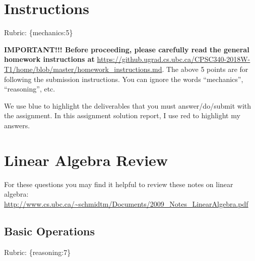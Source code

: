 \documentclass{article}
\def\rubric#1{\gre{Rubric: \{#1\}}}{}
\def\blu#1{{\color{blu}#1}}
\def\gre#1{{\color{gre}#1}}
\def\red#1{{\color{red}#1}}
\begin{document}
\section*{Instructions}
\rubric{mechanics:5}

\textbf{IMPORTANT!!! Before proceeding, please carefully read the general homework instructions at} \url{https://github.ugrad.cs.ubc.ca/CPSC340-2018W-T1/home/blob/master/homework_instructions.md}. The above 5 points are for following the submission instructions. You can ignore the words ``mechanics'', ``reasoning'', etc.

\vspace{1em}
We use \blu{blue} to highlight the deliverables that you must answer/do/submit with the assignment.
\vspace{1em}
In this assignment solution report, I use \red{red} to highlight my answers.
\section{Linear Algebra Review}

For these questions you may find it helpful to review these notes on linear algebra:\\
\url{http://www.cs.ubc.ca/~schmidtm/Documents/2009_Notes_LinearAlgebra.pdf}

\subsection{Basic Operations}
\rubric{reasoning:7}
\end{document}
